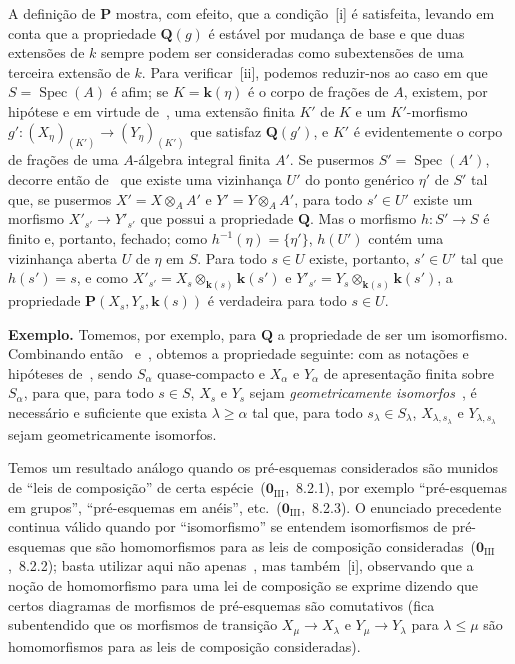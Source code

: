 A definição de $\mathbf{P}$ mostra, com efeito, que a condição~[i] é satisfeita, levando em conta que a propriedade $\mathbf{Q}(g)$ é estável por mudança de base e que duas extensões de $k$ sempre podem ser consideradas como subextensões de uma terceira extensão de $k$.
Para verificar~[ii], podemos reduzir-nos ao caso em que $S=\operatorname{Spec}(A)$ é afim; se $K=\mathbf{k}(\eta)$ é o corpo de frações de $A$, existem, por hipótese e em virtude de~, uma extensão finita $K'$ de $K$ e um $K'$-morfismo $g':(X_\eta)_{(K')}\to(Y_\eta)_{(K')}$ que satisfaz $\mathbf{Q}(g')$, e $K'$ é evidentemente o corpo de frações de uma $A$-álgebra integral finita $A'$.
Se pusermos $S'=\operatorname{Spec}(A')$, decorre então de~ que existe uma vizinhança $U'$ do ponto genérico $\eta'$ de $S'$ tal que, se pusermos $X'=X\otimes_A A'$ e $Y'=Y\otimes_A A'$, para todo $s'\in U'$ existe um morfismo $X'_{s'}\to Y'_{s'}$ que possui a propriedade $\mathbf{Q}$.
Mas o morfismo $h:S'\to S$ é finito e, portanto, fechado; como $h^{-1}(\eta)=\{\eta'\}$, $h(U')$ contém uma vizinhança aberta $U$ de $\eta$ em $S$.
Para todo $s\in U$ existe, portanto, $s'\in U'$ tal que $h(s')=s$, e como $X'_{s'}=X_s\otimes_{\mathbf{k}(s)}\mathbf{k}(s')$ e $Y'_{s'}=Y_s\otimes_{\mathbf{k}(s)}\mathbf{k}(s')$, a propriedade $\mathbf{P}(X_s,Y_s,\mathbf{k}(s))$ é verdadeira para todo $s\in U$.

\begin{env}[9.3.6]
\label{IV.9.3.6}
\textbf{Exemplo.}
Tomemos, por exemplo, para $\mathbf{Q}$ a propriedade de ser um isomorfismo.
Combinando então~ e~, obtemos a propriedade seguinte: com as notações e hipóteses de~, sendo $S_\alpha$ quase-compacto e $X_\alpha$ e $Y_\alpha$ de apresentação finita sobre $S_\alpha$, para que, para todo $s\in S$, $X_s$ e $Y_s$ sejam \emph{geometricamente isomorfos}~, é necessário e suficiente que exista $\lambda\geqslant\alpha$ tal que, para todo $s_\lambda\in S_\lambda$, $X_{\lambda,s_\lambda}$ e $Y_{\lambda,s_\lambda}$ sejam geometricamente isomorfos.
\end{env}

Temos um resultado análogo quando os pré-esquemas considerados são munidos de ``leis de composição'' de certa espécie~($\mathbf{0}_{\mathrm{III}}$,~8.2.1), por exemplo ``pré-esquemas em grupos'', ``pré-esquemas em anéis'', etc.~($\mathbf{0}_{\mathrm{III}}$,~8.2.3).
O enunciado precedente continua válido quando por ``isomorfismo'' se entendem isomorfismos de pré-esquemas que são homomorfismos para as leis de composição consideradas~($\mathbf{0}_{\mathrm{III}}$,~8.2.2); basta utilizar aqui não apenas~, mas também~[i], observando que a noção de homomorfismo para uma lei de composição se exprime dizendo que certos diagramas de morfismos de pré-esquemas são comutativos (fica subentendido que os morfismos de transição $X_\mu\to X_\lambda$ e $Y_\mu\to Y_\lambda$ para $\lambda\leqslant\mu$ são homomorfismos para as leis de composição consideradas).

